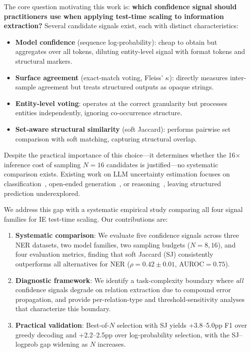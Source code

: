 \documentclass[11pt,a4paper]{article}
\begin{document}
The core question motivating this work is: \textbf{which confidence signal should practitioners use when applying test-time scaling to information extraction?} Several candidate signals exist, each with distinct characteristics:
\begin{itemize}
\item \textbf{Model confidence} (sequence log-probability): cheap to obtain but aggregates over all tokens, diluting entity-level signal with format tokens and structural markers.
\item \textbf{Surface agreement} (exact-match voting, Fleiss' $\kappa$): directly measures inter-sample agreement but treats structured outputs as opaque strings.
\item \textbf{Entity-level voting}: operates at the correct granularity but processes entities independently, ignoring co-occurrence structure.
\item \textbf{Set-aware structural similarity} (soft Jaccard): performs pairwise set comparison with soft matching, capturing structural overlap.
\end{itemize}

Despite the practical importance of this choice---it determines whether the 16$\times$ inference cost of sampling $N{=}16$ candidates is justified---no systematic comparison exists. Existing work on LLM uncertainty estimation focuses on classification~\cite{kadavath2022language}, open-ended generation~\cite{kuhn2023semantic,manakul2023selfcheckgpt}, or reasoning~\cite{wang2023selfconsistency,chen2024universal}, leaving structured prediction underexplored.

We address this gap with a systematic empirical study comparing all four signal families for IE test-time scaling. Our contributions are:

\begin{enumerate}
\item \textbf{Systematic comparison}: We evaluate five confidence signals across three NER datasets, two model families, two sampling budgets ($N{=}8, 16$), and four evaluation metrics, finding that soft Jaccard (SJ) consistently outperforms all alternatives for NER ($\rho=0.42 \pm 0.01$, AUROC$=0.75$).
\item \textbf{Diagnostic framework}: We identify a task-complexity boundary where \emph{all} confidence signals degrade on relation extraction due to compound error propagation, and provide per-relation-type and threshold-sensitivity analyses that characterize this boundary.
\item \textbf{Practical validation}: Best-of-$N$ selection with SJ yields +3.8--5.0pp F1 over greedy decoding and +2.2--2.5pp over log-probability selection, with the SJ--logprob gap widening as $N$ increases.
\end{enumerate}
\end{document}
